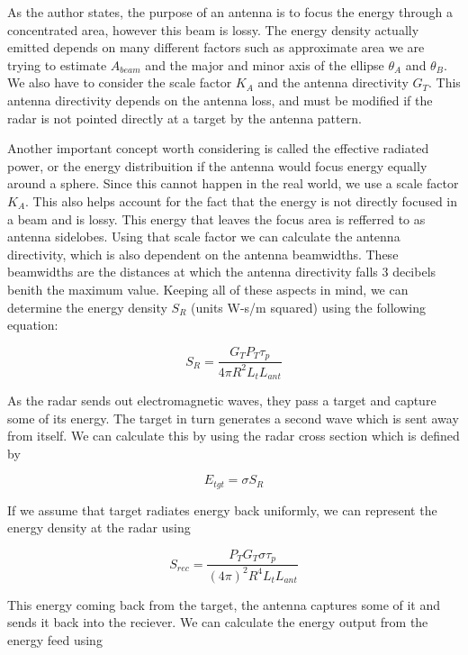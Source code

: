 \documentclass[12pt]{article}
\begin{document}
As the author states, the purpose of an antenna is to focus the energy through a concentrated area, however this beam is lossy. The energy density actually emitted depends on many different factors such as approximate area we are trying to estimate $A_{beam}$ and the major and minor axis of the ellipse $\theta_A$ and $\theta_B$. We also have to consider the scale factor $K_A$ and  the antenna directivity $G_T$. This antenna directivity depends on the antenna loss, and must be modified if the radar is not pointed directly at a target by the antenna pattern. 

Another important concept worth considering is called the effective radiated power, or the energy distribuition if the antenna would focus energy equally around a sphere. Since this cannot happen in the real world, we use a scale factor $K_A$. This also helps account for the fact that the energy is not directly focused in a beam and is lossy. This energy that leaves the focus area is refferred to as antenna sidelobes. Using that scale factor we can calculate the antenna directivity, which is also dependent on the antenna beamwidths. These beamwidths are the distances at which the antenna directivity falls 3 decibels benith the maximum value. Keeping all of these aspects in mind, we can determine the energy density $S_R$ (units W-s/m squared) using the following equation:

\begin{equation}
    S_R = \frac{G_T P_T \tau_p}{4 \pi R^2 L_t L_{ant}}
\end{equation}

As the radar sends out electromagnetic waves, they pass a target and capture some of its energy. The target in turn generates a second wave which is sent away from itself. We can calculate this by using the radar cross section which is defined by

\begin{equation}
    E_{tgt} = \sigma S_R 
\end{equation}

If we assume that target radiates energy back uniformly, we can represent the energy density at the radar using 

\begin{equation}
    S_{rec} = \frac{P_T G_T \sigma \tau_p}{(4 \pi)^2 R^4 L_t L_{ant}}
\end{equation}

This energy coming back from the target, the antenna captures some of it and sends it back into the reciever. We can calculate the energy output from the energy feed using
\end{document}
